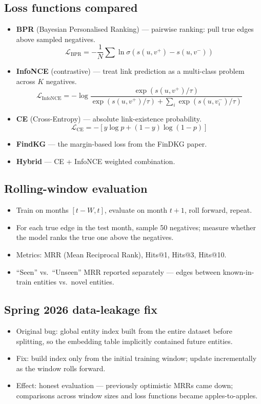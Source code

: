 \documentclass[11pt]{article}
\begin{document}
\subsection{Loss functions compared}
\begin{itemize}
  \item \textbf{BPR} (Bayesian Personalised Ranking) --- pairwise ranking: pull true edges above sampled negatives.
    \[ \mathcal{L}_{\text{BPR}} = -\frac{1}{N} \sum \ln \sigma(s(u, v^+) - s(u, v^-)) \]
  \item \textbf{InfoNCE} (contrastive) --- treat link prediction as a multi-class problem across \(K\) negatives.
    \[ \mathcal{L}_{\text{InfoNCE}} = -\log \frac{\exp(s(u, v^+)/\tau)}{\exp(s(u, v^+)/\tau) + \sum_i \exp(s(u, v_i^-)/\tau)} \]
  \item \textbf{CE} (Cross-Entropy) --- absolute link-existence probability.
    \[ \mathcal{L}_{\text{CE}} = -[y \log p + (1-y) \log(1-p)] \]
  \item \textbf{FindKG} --- the margin-based loss from the FinDKG paper.
  \item \textbf{Hybrid} --- CE + InfoNCE weighted combination.
\end{itemize}

\subsection{Rolling-window evaluation}
\begin{itemize}
  \item Train on months \([t - W, t]\), evaluate on month \(t + 1\), roll forward, repeat.
  \item For each true edge in the test month, sample 50 negatives; measure whether the model ranks the true one above the negatives.
  \item Metrics: MRR (Mean Reciprocal Rank), Hits@1, Hits@3, Hits@10.
  \item ``Seen'' vs.\ ``Unseen'' MRR reported separately --- edges between known-in-train entities vs.\ novel entities.
\end{itemize}

\subsection{Spring 2026 data-leakage fix}
\begin{itemize}
  \item Original bug: global entity index built from the entire dataset before splitting, so the embedding table implicitly contained future entities.
  \item Fix: build index only from the initial training window; update incrementally as the window rolls forward.
  \item Effect: honest evaluation --- previously optimistic MRRs came down; comparisons across window sizes and loss functions became apples-to-apples.
\end{itemize}
\end{document}
